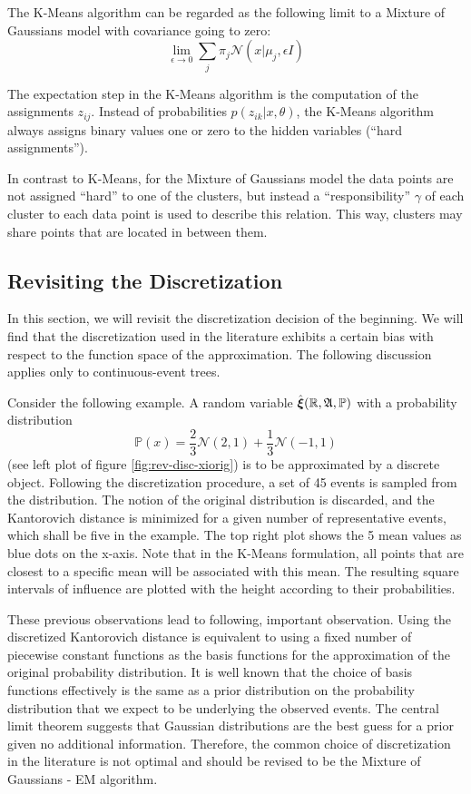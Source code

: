 The K-Means algorithm can be regarded as the following limit to a Mixture of Gaussians model with covariance going to zero:
\begin{equation}
  \label{eq:23}
  \lim\limits_{\epsilon\rightarrow 0}\sum_j\pi_j\mathcal{N}(x| \mu_j,\epsilon I)
\end{equation}

The expectation step in the K-Means algorithm is the computation of the assignments $z_{ij}$.
Instead of probabilities $p(z_{ik}|x,\theta)$, the K-Means algorithm always assigns binary values one or zero to the hidden variables (``hard assignments'').

In contrast to K-Means, for the Mixture of Gaussians model the data points are not assigned ``hard'' to one of the clusters, but instead a ``responsibility'' $\gamma$ of each cluster to each data point is used to describe this relation.
This way, clusters may share points that are located in between them.
\subsection{Revisiting the Discretization}
\label{sec:revisiting-discretization}
In this section, we will revisit the discretization decision of the beginning.
We will find that the discretization used in the literature exhibits a certain bias with respect to the function space of the approximation.
The following discussion applies only to continuous-event trees.

Consider the following example.
A random variable $\hat{\boldsymbol\xi}(\mathbb{R}, \mathfrak{A}, \mathbb{P})$ with a probability distribution
\begin{equation}
  \label{eq:24}
  \mathbb{P}(x) = \frac{2}{3}\mathcal{N}(2,1) + \frac{1}{3}\mathcal{N}(-1,1)
\end{equation}
(see left plot of figure \ref{fig:rev-disc-xiorig}) is to be approximated by a discrete object.
Following the discretization procedure, a set of 45 events is sampled from the distribution.
The notion of the original distribution is discarded, and the Kantorovich distance is minimized for a given number of representative events, which shall be five in the example.
The top right plot shows the 5 mean values as blue dots on the x-axis.
Note that in the K-Means formulation, all points that are closest to a specific mean will be associated with this mean.
The resulting square intervals of influence are plotted with the height according to their probabilities.

These previous observations lead to following, important observation.
Using the discretized Kantorovich distance is equivalent to using a fixed number of piecewise constant functions as the basis functions for the approximation of the original probability distribution.
It is well known that the choice of basis functions effectively is the same as a prior distribution on the probability distribution that we expect to be underlying the observed events.
The central limit theorem suggests that Gaussian distributions are the best guess for a prior given no additional information.
Therefore, the common choice of discretization in the literature \cite{Dupacova2003} is not optimal and should be revised to be the Mixture of Gaussians - EM algorithm.


